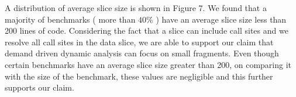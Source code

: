\documentclass[12pt]{article}
\begin{document}
 
A distribution of average slice size is shown in Figure 7. We found that a majority of benchmarks ( more than $40\%$ ) have an average slice size less than 200 lines of code. Considering the fact that a slice can include call sites and we resolve all call sites in the data slice, we are able to support our claim that demand driven dynamic analysis can focus on small fragments. Even though certain benchmarks have an average slice size greater than 200, on comparing it with the size of the benchmark, these values are negligible and this further supports our claim.  \\
\end{document}
